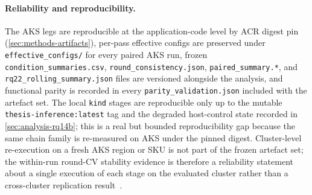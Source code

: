 \paragraph{Reliability and reproducibility.}
The AKS legs are reproducible at the application-code level by ACR
digest pin (\cref{sec:methods-artifacts}), per-pass effective configs
are preserved under \texttt{effective\_configs/} for every paired AKS
run, frozen \texttt{condition\_summaries.csv},
\texttt{round\_consistency.json}, \texttt{paired\_summary.*}, and
\texttt{rq22\_rolling\_summary.json} files are versioned alongside the
analysis, and functional parity is recorded in every
\texttt{parity\_validation.json} included with the artefact set. The
local \texttt{kind} stages are reproducible only up to the mutable
\texttt{thesis-inference:latest} tag and the degraded host-control
state recorded in \cref{sec:analysis-rq14b}; this is a real but
bounded reproducibility gap because the same chain family is
re-measured on AKS under the pinned digest. Cluster-level
re-execution on a fresh AKS region or SKU is not part of the frozen
artefact set; the within-run round-CV stability evidence is therefore
a reliability statement about a single execution of each stage on the
evaluated cluster rather than a cross-cluster replication
result~\cite{benchmarking_sc15}.

